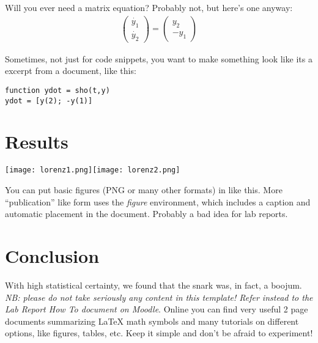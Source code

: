 \documentclass[12pt]{article}
\begin{document}
Will you ever need a matrix equation?  Probably not, but here's one anyway:
\begin{eqnarray*}
\begin{pmatrix} \dot{y_1}\\
                         \dot{y_2}
       \end{pmatrix}
=
\begin{pmatrix} {y_2}\\
                         -{y_1}
       \end{pmatrix}
\end{eqnarray*}


Sometimes, not just for code snippets, you want to make something look like its a excerpt from 
a document, like this:
\begin{verbatim}
function ydot = sho(t,y)
ydot = [y(2); -y(1)]
\end{verbatim}


\section{Results}


\medskip
\texttt{[image: lorenz1.png]}\texttt{[image: lorenz2.png]}

You can put basic figures (PNG or many other formats) in like this.  More ``publication'' like
form uses the {\em figure} environment, which includes a caption and automatic placement
in the document.  Probably a bad idea for lab reports.

\section{Conclusion}
With high statistical certainty, we found that the snark was, in fact, a boojum.  {\em NB: please
do not take seriously any content in this template!  Refer instead to the Lab Report How To 
document on Moodle}.  Online you can find very useful 2 page documents summarizing
LaTeX math symbols and many tutorials on different options, like figures, tables, etc.
Keep it simple and don't be afraid to experiment!
\end{document}
